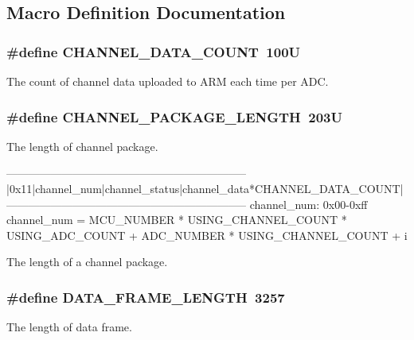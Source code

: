 \subsection{Macro Definition Documentation}
\hypertarget{group___a_r_m_const_ga50e0cf6a0eda6888a94b16f97f149d01}{
\subsubsection[{C\-H\-A\-N\-N\-E\-L\-\_\-\-D\-A\-T\-A\-\_\-\-C\-O\-U\-N\-T}]{\setlength{\rightskip}{0pt plus 5cm}\#define C\-H\-A\-N\-N\-E\-L\-\_\-\-D\-A\-T\-A\-\_\-\-C\-O\-U\-N\-T~100\-U}}\label{group___a_r_m_const_ga50e0cf6a0eda6888a94b16f97f149d01}
The count of channel data uploaded to A\-R\-M each time per A\-D\-C. \hypertarget{group___a_r_m_const_gab65286a9232a564c392196519e2ab6ba}{
\subsubsection[{C\-H\-A\-N\-N\-E\-L\-\_\-\-P\-A\-C\-K\-A\-G\-E\-\_\-\-L\-E\-N\-G\-T\-H}]{\setlength{\rightskip}{0pt plus 5cm}\#define C\-H\-A\-N\-N\-E\-L\-\_\-\-P\-A\-C\-K\-A\-G\-E\-\_\-\-L\-E\-N\-G\-T\-H~203\-U}}\label{group___a_r_m_const_gab65286a9232a564c392196519e2ab6ba}
The length of channel package.

\begin{DoxyVerb}-----------------------------------------------------------------
|0x11|channel_num|channel_status|channel_data*CHANNEL_DATA_COUNT|
-----------------------------------------------------------------
channel_num: 0x00-0xff
channel_num = MCU_NUMBER * USING_CHANNEL_COUNT * USING_ADC_COUNT + ADC_NUMBER * USING_CHANNEL_COUNT + i
\end{DoxyVerb}
The length of a channel package. \hypertarget{group___a_r_m_const_gabb5ec28e1c20e234410dc0f24de7d735}{
\subsubsection[{D\-A\-T\-A\-\_\-\-F\-R\-A\-M\-E\-\_\-\-L\-E\-N\-G\-T\-H}]{\setlength{\rightskip}{0pt plus 5cm}\#define D\-A\-T\-A\-\_\-\-F\-R\-A\-M\-E\-\_\-\-L\-E\-N\-G\-T\-H~3257}}\label{group___a_r_m_const_gabb5ec28e1c20e234410dc0f24de7d735}
The length of data frame.


